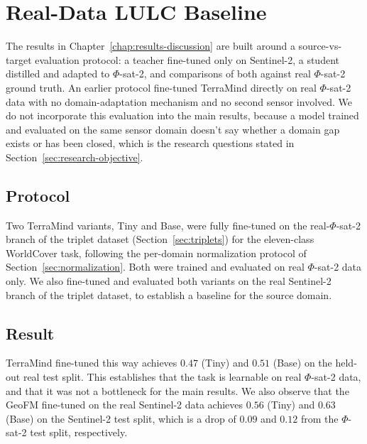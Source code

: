 \chapter{Real-Data LULC Baseline}
\label{app:real-baseline}

The results in Chapter~\ref{chap:results-discussion} are built around a source-vs-target evaluation protocol: a teacher fine-tuned only on Sentinel-2, a student distilled and adapted to $\Phi$-sat-2, and comparisons of both against real $\Phi$-sat-2 ground truth.
An earlier protocol fine-tuned TerraMind directly on real $\Phi$-sat-2  data with no domain-adaptation mechanism and no second sensor involved.
We do not incorporate this evaluation into the main results, because a model trained and evaluated on the same sensor domain doesn't say whether a domain gap exists or has been closed, which is the research questions stated in Section~\ref{sec:research-objective}.

\section{Protocol}

Two TerraMind variants, Tiny and Base, were fully fine-tuned on the real-$\Phi$-sat-2 branch of the triplet dataset (Section~\ref{sec:triplets}) for the eleven-class WorldCover  task, following the per-domain normalization protocol of Section~\ref{sec:normalization}.
Both were trained and evaluated on real $\Phi$-sat-2 data only. We also fine-tuned and evaluated both variants on the real Sentinel-2 branch of the triplet dataset, to establish a baseline for the source domain.

\section{Result}

TerraMind fine-tuned this way achieves  $0.47$ (Tiny) and $0.51$ (Base) on the held-out real test split.
This establishes that the  task is learnable on real $\Phi$-sat-2 data, and that it was not a bottleneck for the main results.
We also observe that the GeoFM fine-tuned on the real Sentinel-2 data achieves  $0.56$ (Tiny) and $0.63$ (Base) on the Sentinel-2 test split, which is a drop of $0.09$ and $0.12$ from the $\Phi$-sat-2 test split, respectively.

